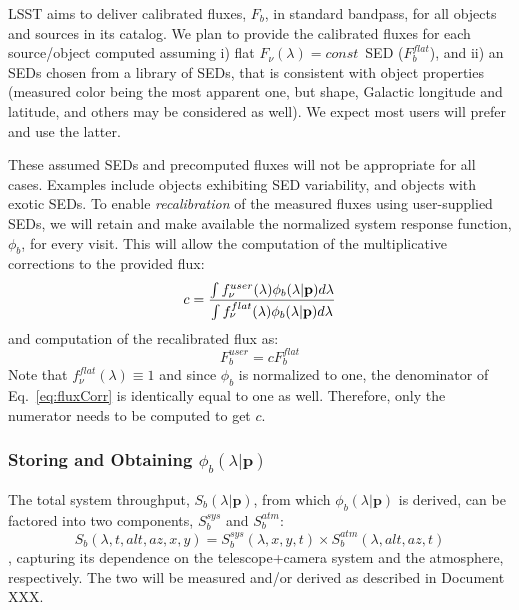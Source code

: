 \documentclass[12pt,preprint]{aastex}
\begin{document}
LSST aims to deliver calibrated fluxes, $F_b$, in standard bandpass, for all objects and sources in its catalog. We plan to provide the calibrated fluxes for each source/object computed assuming i) flat $F_\nu(\lambda) = const\,$ SED ($F_b^{flat}$), and ii) an SEDs chosen from a library of SEDs, that is consistent with object properties (measured color being the most apparent one, but shape, Galactic longitude and latitude, and others may be considered as well). We expect most users will prefer and use the latter.

These assumed SEDs and precomputed fluxes will not be appropriate for all cases. Examples include objects exhibiting SED variability, and objects with exotic SEDs. 
To enable {\em recalibration} of the measured fluxes using user-supplied SEDs, we will retain and make available the normalized system response function, $\phi_b$, for every visit. This will allow the computation of the multiplicative corrections to the provided flux:
%
\begin{equation} \label{eq:fluxCorr}
    c = { \int f_\nu^{user}(\lambda) \phi_b(\lambda|\mathbf{p}) d\lambda \over \int f_\nu^{flat}(\lambda) \phi_b(\lambda|\mathbf{p}) d\lambda }
\end{equation}
%
and computation of the recalibrated flux as:
%
\begin{equation}
     F_b^{user} = c F_b^{flat}
\end{equation}
%
Note that $f_\nu^{flat}(\lambda) \equiv 1$ and since $\phi_b$ is normalized to one, the denominator of Eq.~\ref{eq:fluxCorr} is identically equal to one as well. Therefore, only the numerator needs to be computed to get $c$.

\subsubsection{Storing and Obtaining $\phi_b(\lambda|\mathbf{p})$}

The total system throughput, $S_b(\lambda | \mathbf{p})$, from which $\phi_b(\lambda | \mathbf{p})$ is derived, can be factored into two components, $S_b^{sys}$ and $S_b^{atm}$:
%
\begin{equation}
    S_b(\lambda, t, alt, az, x, y) = S_b^{sys}(\lambda, x, y, t) \times S_b^{atm}(\lambda, alt, az, t)
\end{equation}
%
, capturing its dependence on the telescope+camera system and the atmosphere, respectively. The two will be measured and/or derived as described in Document XXX.
\end{document}
